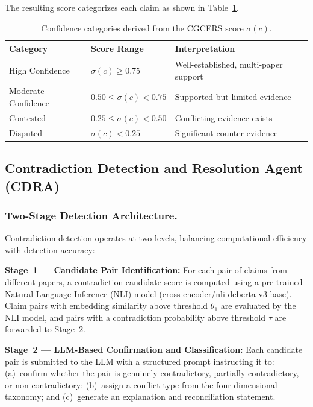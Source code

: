 The resulting score categorizes each claim as shown in Table~\ref{tab:confidence}.

\begin{table}[ht]
\caption{Confidence categories derived from the CGCERS score $\sigma(c)$.}\label{tab:confidence}
\centering
\begin{tabular}{lll}
\toprule
\textbf{Category} & \textbf{Score Range} & \textbf{Interpretation} \\
\midrule
High Confidence & $\sigma(c) \geq 0.75$ & Well-established, multi-paper support \\
Moderate Confidence & $0.50 \leq \sigma(c) < 0.75$ & Supported but limited evidence \\
Contested & $0.25 \leq \sigma(c) < 0.50$ & Conflicting evidence exists \\
Disputed & $\sigma(c) < 0.25$ & Significant counter-evidence \\
\bottomrule
\end{tabular}
\end{table}

\subsection{Contradiction Detection and Resolution Agent (CDRA)}

\subsubsection{Two-Stage Detection Architecture.}
Contradiction detection operates at two levels, balancing computational efficiency with detection accuracy:

\noindent\textbf{Stage~1 --- Candidate Pair Identification:} For each pair of claims from different papers, a contradiction candidate score is computed using a pre-trained Natural Language Inference (NLI) model (cross-encoder/nli-deberta-v3-base). Claim pairs with embedding similarity above threshold $\theta_1$ are evaluated by the NLI model, and pairs with a contradiction probability above threshold $\tau$ are forwarded to Stage~2.

\noindent\textbf{Stage~2 --- LLM-Based Confirmation and Classification:} Each candidate pair is submitted to the LLM with a structured prompt instructing it to: (a)~confirm whether the pair is genuinely contradictory, partially contradictory, or non-contradictory; (b)~assign a conflict type from the four-dimensional taxonomy; and (c)~generate an explanation and reconciliation statement.

